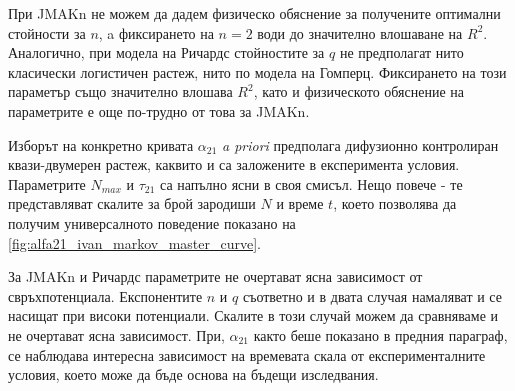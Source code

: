 При JMAKn не можем да дадем физическо обяснение за получените оптимални стойности за $n$, a фиксирането на $n = 2$ води до значително влошаване на $R^2$. Аналогично, при модела на Ричардс стойностите за $q$ не предполагат нито класически логистичен растеж, нито по модела на Гомперц. Фиксирането на този параметър също значително влошава $R^2$, като и физическото обяснение на параметрите е още по-трудно от това за JMAKn.

Изборът на конкретно кривата $\alpha_{21}$ \textit{a priori} предполага дифузионно контролиран квази-двумерен растеж, каквито и са заложените в експеримента условия. Параметрите $N_{max}$ и $\tau_{21}$ са напълно ясни в своя смисъл. Нещо повече - те представляват скалите за брой зародиши $N$ и време $t$, което позволява да получим универсалното поведение показано на \autoref{fig:alfa21_ivan_markov_master_curve}. 

За JMAKn и Ричардс параметрите не очертават ясна зависимост от свръхпотенциала. Експонентите $n$ и $q$ съответно и в двата случая намаляват и се насищат при високи потенциали. Скалите в този случай можем да сравняваме и не очертават ясна зависимост. При, $\alpha_{21}$ както беше показано в предния параграф, се наблюдава интересна зависимост на времевата скала от експерименталните условия, което може да бъде основа на бъдещи изследвания.
